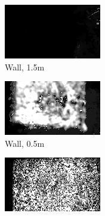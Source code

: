 \begin{figure}[h!t]
    \begin{subfigure}[b]{0.25\textwidth}
        \centering
        \includegraphics[width=0.9\linewidth]{images/materials/wall-far-conf}
        \caption{Wall, 1.5m}
        \label{fig:material-wall-far}
    \end{subfigure}%
    \begin{subfigure}[b]{0.25\textwidth}
        \centering
        \includegraphics[width=0.9\linewidth]{images/materials/wall-close-conf}
        \caption{Wall, 0.5m}
        \label{fig:material-wall-close}
    \end{subfigure}%
    \begin{subfigure}[b]{0.25\textwidth}
        \centering
        \includegraphics[width=0.9\linewidth]{images/materials/carpet-conf}

\end{subfigure}
\end{figure}
